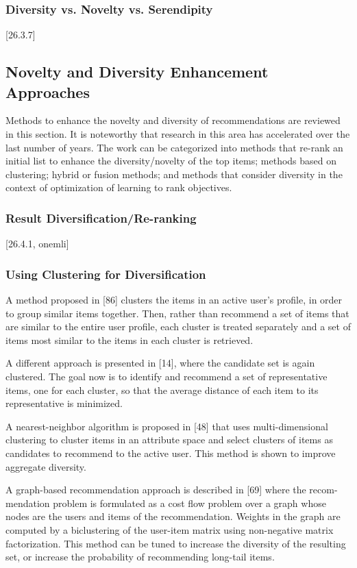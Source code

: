 \subsubsection{Diversity vs. Novelty vs. Serendipity}
[26.3.7]

\subsection{Novelty and Diversity Enhancement Approaches}

Methods to enhance the novelty and diversity of recommendations are reviewed in this section. It is noteworthy that research in this area has accelerated over the last number of years. The work can be categorized into methods that re-rank an initial list to enhance the diversity/novelty of the top items; methods based on clustering; hybrid or fusion methods; and methods that consider diversity in the context of optimization of learning to rank objectives.

\subsubsection{Result Diversification/Re-ranking}
[26.4.1, onemli]

\subsubsection{Using Clustering for Diversification}

A method proposed in [86] clusters the items in an active user’s profile, in order to group similar items together. Then, rather than recommend a set of items that are similar to the entire user profile, each cluster is treated separately and a set of items most similar to the items in each cluster is retrieved.

A different approach is presented in [14], where the candidate set is again clustered. The goal now is to identify and recommend a set of representative items, one for each cluster, so that the average distance of each item to its representative is minimized.

A nearest-neighbor algorithm is proposed in [48] that uses multi-dimensional clustering to cluster items in an attribute space and select clusters of items as candidates to recommend to the active user. This method is shown to improve aggregate diversity.

A graph-based recommendation approach is described in [69] where the recom- mendation problem is formulated as a cost flow problem over a graph whose nodes are the users and items of the recommendation. Weights in the graph are computed by a biclustering of the user-item matrix using non-negative matrix factorization. This method can be tuned to increase the diversity of the resulting set, or increase the probability of recommending long-tail items.


